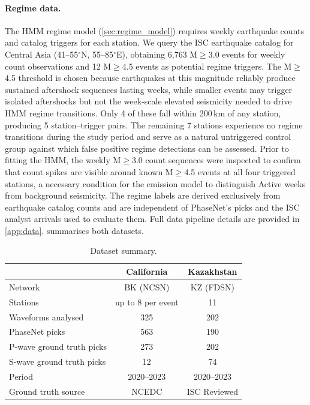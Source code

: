\paragraph{Regime data.}
The HMM regime model (\cref{sec:regime_model}) requires 
weekly earthquake counts and catalog triggers for each station. We query the ISC earthquake catalog for Central Asia (41--55$^\circ$N, 55--85$^\circ$E), obtaining 
6{,}763 M$\geq$3.0 events for weekly count observations and 12 M$\geq$4.5 events as potential regime triggers. The M$\geq$4.5 threshold is chosen because earthquakes at 
this magnitude reliably produce sustained aftershock sequences lasting weeks, while smaller events may trigger isolated aftershocks but not the week-scale elevated 
seismicity needed to drive HMM regime transitions. Only 4 of these fall within 200\,km of any station, producing 5 station--trigger pairs. The remaining 7 stations 
experience no regime transitions during the study period and serve as a natural untriggered control group against which false positive regime detections can be 
assessed. Prior to fitting the HMM, the weekly M$\geq$3.0 count sequences were inspected to confirm that count spikes are visible around known M$\geq$4.5 events at 
all four triggered stations, a necessary condition for the emission model to distinguish Active weeks from background seismicity. The regime labels are derived 
exclusively from earthquake catalog counts and are independent of PhaseNet's picks and the ISC analyst arrivals used to evaluate them. Full data pipeline details are provided in \cref{app:data}.  summarises both datasets.

\begin{table}[t]
    \centering
    \caption{Dataset summary.}
    \label{tab:data}
    \small
    \begin{tabular}{@{}lcc@{}}
        \toprule
        & California & Kazakhstan \\
        \midrule
        Network & BK (NCSN) & KZ (FDSN) \\
        Stations & up to 8 per event & 11 \\
        Waveforms analysed & 325 & 202 \\
        PhaseNet picks & 563 & 190 \\
        P-wave ground truth picks & 273 & 202 \\
        S-wave ground truth picks & 12 & 74 \\
        Period & 2020--2023 & 2020--2023 \\
        Ground truth source & NCEDC & ISC Reviewed \\
        \bottomrule
    \end{tabular}
\end{table}

